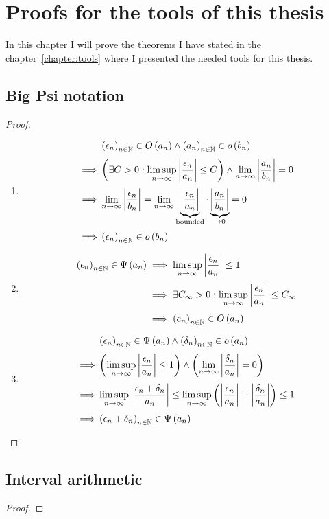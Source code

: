 \chapter{Proofs for the tools of this thesis}

In this chapter I will prove the theorems I have stated in the chapter~\ref{chapter:tools} where I presented the needed tools for this thesis.

\section{Big Psi notation}



\begin{proof} ~
  \begin{enumerate}
    \item

      \begin{align}
        & \seq{\epsilon_n}\in\bigo{a_n} \land \seq{a_n} \in \littleo{b_n} \nl
        \implies & \left(\exists C > 0: \limsup_{n\to\infty} \abs{\frac{\epsilon_n}{a_n}} \le C\right) \land \lim_{n\to\infty} \abs{\frac{a_n}{b_n}} = 0 \nl
        \implies & \lim_{n\to\infty} \abs{\frac{\epsilon_n}{b_n}} = \lim_{n\to\infty} \underbrace{\abs{\frac{\epsilon_n}{a_n}}}_{\text{bounded}} \cdot \underbrace{\abs{\frac{a_n}{b_n}}}_{\to 0} = 0 \nl
        \implies & \seq{\epsilon_n} \in \littleo{b_n}
      \end{align}
    \item

      \begin{align}
        \seq{\epsilon_n} \in \bigpsi{a_n} & \implies \limsup_{n\to\infty} \abs{\frac{\epsilon_n}{a_n}} \le 1 \nl
                                          & \implies \exists C_\infty > 0 : \limsup_{n\to\infty} \abs{\frac{\epsilon_n}{a_n}} \le C_\infty \nl
                                          & \implies \seq{e_n} \in \bigo{a_n}
      \end{align}

    \item

      \begin{align}
        & \seq{\epsilon_n} \in \bigpsi{a_n} \land \seq{\delta_n} \in \littleo{a_n} \nl
        \implies& \left(\limsup_{n\to\infty} \abs{\frac{\epsilon_n}{a_n}} \le 1\right) \land \left(\lim_{n\to\infty} \abs{\frac{\delta_n}{a_n}} = 0\right) \nl
        \implies& \limsup_{n\to\infty} \abs{\frac{\epsilon_n+\delta_n}{a_n}} \le \limsup_{n\to\infty} \left(\abs{\frac{\epsilon_n}{a_n}}+\abs{\frac{\delta_n}{a_n}}\right) \le 1 \nl
        \implies& \seq{\epsilon_n+\delta_n} \in \bigpsi{a_n}
      \end{align}
  \end{enumerate}
\end{proof}

\section{Interval arithmetic}

\begin{theorem}

\end{theorem}

\begin{proof}

\end{proof}
